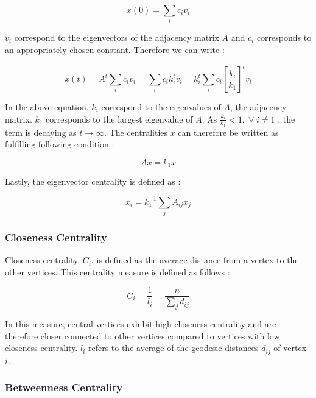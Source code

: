 	\begin{equation}
		x(0) =  \sum_{i}c_{i}v_{i}
	\end{equation}

	\noindent $v_i$ correspond to the eigenvectors of the adjacency matrix $A$
	and $c_i$ corresponds to an appropriately chosen constant. Therefore we can
	write \citep[p. 170]{Newman2010}:

	\begin{equation}
		x(t) =  A^t \sum_{i}c_{i}v_{i} = \sum_{i} c_i k_i^t v_i = 
		k_i^t \sum_{i} c_i \left[\frac{k_i}{k_1}\right]^t v_i
	\end{equation}

	\noindent In the above equation, $k_i$ correspond to the eigenvalues of $A$, 
	the adjacency matrix. $k_1$ corresponds to the largest eigenvalue of $A$.
	As $\frac{k_i}{k_1} < 1, \; \forall \; i\neq 1$ , the term is decaying as 
	$t \rightarrow \infty$. The centralities $x$ can therefore be written
	as fulfilling following condition \citep[p. 170]{Newman2010}:

	\begin{equation}
		Ax = k_1 x	
	\end{equation}

	\noindent Lastly, the eigenvector centrality is defined as \citep[p. 170]{Newman2010}:

	\begin{equation}
		x_i = k_{1}^{-1} \sum_{j} A_{ij}x_j 
	\end{equation}

	\subsubsection{Closeness Centrality}

	Closeness centrality, $C_i$, is defined as the average distance from a vertex to the
	other vertices. This centrality measure is defined as follows \citep[p.
	182]{Newman2010}:

	\begin{equation}
		C_i = \frac{1}{l_i} = \frac{n}{\sum_{j}d_{ij}}
	\end{equation}

	\noindent In this measure, central vertices exhibit high closeness 
	centrality and are therefore closer connected to other vertices compared to 
	vertices with low closeness centrality. $l_i$ refers to the average of the 
	geodesic distances $d_{ij}$ of vertex $i$.

	\subsubsection{Betweenness Centrality}

